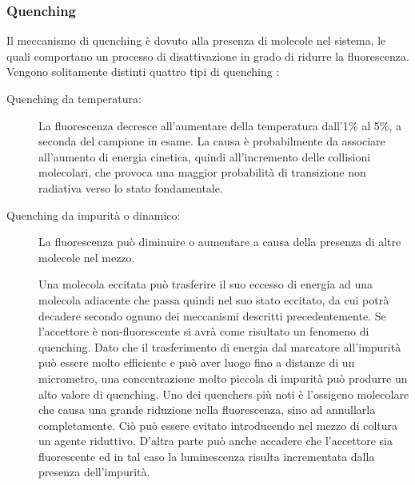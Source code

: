 \subsubsection*{Quenching}
Il meccanismo di quenching è dovuto alla presenza di molecole nel sistema, le quali comportano un processo di disattivazione in grado di ridurre la fluorescenza. Vengono solitamente distinti quattro tipi di quenching \cite{quenching}:
\begin{description}
\item [Quenching da temperatura:]
La fluorescenza decresce all'aumentare della temperatura dall'1\% al 5\%, a seconda del campione in esame. 
La causa è probabilmente da associare all'aumento di energia cinetica, quindi all'incremento delle collisioni molecolari, che provoca una maggior probabilità di transizione non radiativa verso lo stato fondamentale.

\item [Quenching da impurità o dinamico:]
La fluorescenza può diminuire o aumentare a causa della presenza di altre molecole nel mezzo.

Una molecola eccitata può trasferire il suo eccesso di energia ad una molecola adiacente che passa quindi nel suo stato eccitato, da cui potrà decadere
secondo ognuno dei meccanismi descritti precedentemente. 
Se l'accettore è non-fluorescente si avrà come risultato un fenomeno di quenching. 
Dato che il trasferimento di energia dal marcatore all'impurità può essere molto efficiente e può aver luogo fino a distanze di un micrometro, una concentrazione molto piccola di impurità può produrre un alto valore di quenching. 
Uno dei quenchers più noti è l'ossigeno molecolare che causa una grande riduzione nella fluorescenza, sino ad annullarla completamente. 
Ciò può essere evitato introducendo nel mezzo di coltura un agente riduttivo.
D'altra parte può anche accadere che l'accettore sia fluorescente ed in tal caso la luminescenza risulta incrementata dalla presenza dell'impurità.


\end{description}
